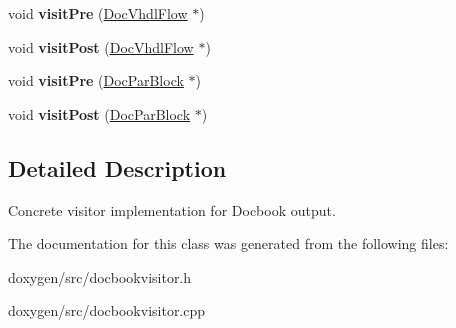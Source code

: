 \begin{DoxyCompactItemize}
void {\bfseries visit\+Pre} (\mbox{\hyperlink{class_doc_vhdl_flow}{Doc\+Vhdl\+Flow}} $\ast$)
\item 
\mbox{\label{class_docbook_doc_visitor_ae66ac181ae326487c4a3dee972acd1f5}} 
void {\bfseries visit\+Post} (\mbox{\hyperlink{class_doc_vhdl_flow}{Doc\+Vhdl\+Flow}} $\ast$)
\item 
\mbox{\label{class_docbook_doc_visitor_a1c3dbcaf7903491fc49aeae4e0b0a64b}} 
void {\bfseries visit\+Pre} (\mbox{\hyperlink{class_doc_par_block}{Doc\+Par\+Block}} $\ast$)
\item 
\mbox{\label{class_docbook_doc_visitor_a9f0567de266ad5486fa5db610059ae34}} 
void {\bfseries visit\+Post} (\mbox{\hyperlink{class_doc_par_block}{Doc\+Par\+Block}} $\ast$)
\end{DoxyCompactItemize}


\subsection{Detailed Description}
Concrete visitor implementation for Docbook output. 

The documentation for this class was generated from the following files\+:\begin{DoxyCompactItemize}
\item 
doxygen/src/docbookvisitor.\+h\item 
doxygen/src/docbookvisitor.\+cpp\end{DoxyCompactItemize}
